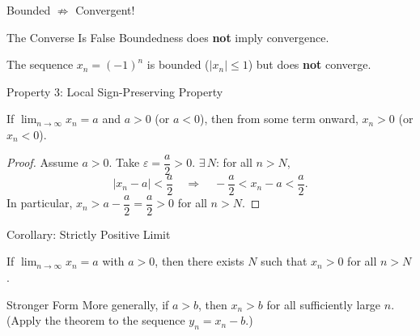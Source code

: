 \documentclass[aspectratio=169,10pt]{beamer}
\begin{document}
\begin{frame}{Bounded $\not\Rightarrow$ Convergent!}
  \begin{alertblock}{The Converse Is False}
    Boundedness does \textbf{not} imply convergence.
  \end{alertblock}
  \pause
  \begin{example}[Counterexample]
    The sequence $x_n = (-1)^n$ is bounded ($|x_n|\leq 1$) but does \textbf{not} converge.
  \end{example}
  \pause
  \begin{center}
  \end{center}
\end{frame}

\begin{frame}{Property 3: Local Sign-Preserving Property}
  \begin{theorem}
    If $\displaystyle\lim_{n\to\infty}x_n = a$ and $a > 0$ (or $a < 0$),
    then from some term onward, $x_n > 0$ (or $x_n < 0$).
  \end{theorem}
  \pause
  \begin{proof}
    Assume $a > 0$. Take $\varepsilon = \dfrac{a}{2} > 0$.
    \pause
    $\exists\,N$: for all $n > N$,
    \[
      |x_n - a| < \frac{a}{2}
      \quad\Longrightarrow\quad
      -\frac{a}{2} < x_n - a < \frac{a}{2}.
    \]
    \pause
    In particular, $x_n > a - \dfrac{a}{2} = \dfrac{a}{2} > 0$ for all $n > N$.
  \end{proof}
\end{frame}

\begin{frame}{Corollary: Strictly Positive Limit}
  \begin{corollary}
    If $\displaystyle\lim_{n\to\infty}x_n = a$ with $a > 0$,
    then there exists $N$ such that $x_n > 0$ for all $n > N$.
  \end{corollary}
  \pause
  \begin{block}{Stronger Form}
    More generally, if $a > b$, then $x_n > b$ for all sufficiently large $n$.
    (Apply the theorem to the sequence $y_n = x_n - b$.)
  \end{block}
\end{frame}
\end{document}
